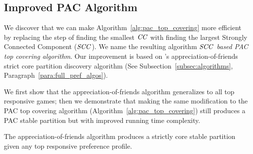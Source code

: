 \subsection{Improved PAC Algorithm}
\label{subsec:improved_pac_algorithm}
We discover that we can make Algorithm~\ref{alg:pac_top_covering} more efficient
by replacing the step of finding the smallest $\mathit{CC}$ with finding the largest
Strongly Connected Component ($\mathit{SCC}$).
We name the resulting algorithm \textit{$\mathit{SCC}$ based PAC top covering algorithm}.
Our improvement is based on 's appreciation-of-friends
strict core partition discovery algorithm (See Subsection~\ref{subsec:algorithms},
Paragraph~\ref{para:full_pref_algos}).

We first show that the appreciation-of-friends algorithm generalizes to all top
responsive games; then we demonstrate that making the same modification to the
PAC top covering algorithm (Algorithm~\ref{alg:pac_top_covering}) still produces
a PAC stable partition but with improved running time complexity.

\begin{proposition}
\label{prop:scc_generalizes}
  The appreciation-of-friends algorithm produces a strictly core stable partition
  given any top responsive preference profile.
\end{proposition}

